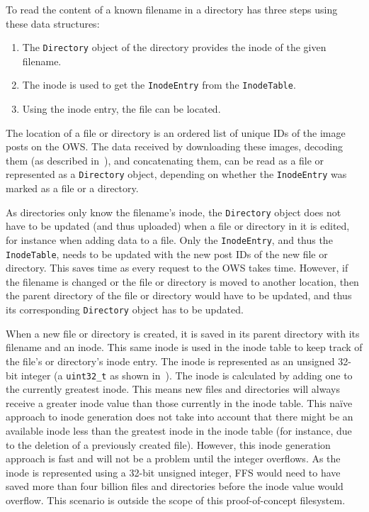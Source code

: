 
\clearpage

To read the content of a known filename in a directory has three steps using these data structures:
\begin{enumerate}
    \item The \texttt{Directory} object of the directory provides the inode of the given filename.
    
    \item The inode is used to get the \texttt{InodeEntry} from the \texttt{InodeTable}.
    
    \item Using the inode entry, the file can be located.
\end{enumerate}

The location of a file or directory is an ordered list of unique IDs of the image posts on the \gls{OWS}. The data received by downloading these images, decoding them (as described in~), and concatenating them, can be read as a file or represented as a \texttt{Directory} object, depending on whether the \texttt{InodeEntry} was marked as a file or a directory. 

As directories only know the filename's inode, the \texttt{Directory} object does not have to be updated (and thus uploaded) when a file or directory in it is edited, for instance when adding data to a file. Only the \texttt{InodeEntry}, and thus the \texttt{InodeTable}, needs to be updated with the new post IDs of the new file or directory. This saves time as every request to the \gls{OWS} takes time. However, if the filename is changed or the file or directory is moved to another location, then the parent directory of the file or directory would have to be updated, and thus its corresponding \texttt{Directory} object has to be updated.

When a new file or directory is created, it is saved in its parent directory with its filename and an inode. This same inode is used in the inode table to keep track of the file's or directory's inode entry. The inode is represented as an unsigned \mbox{32-bit} integer (\ie a \texttt{uint32\_t} as shown in~). The inode is calculated by adding one to the currently greatest inode. This means new files and directories will always receive a greater inode value than those currently in the inode table. This naïve approach to inode generation does not take into account that there might be an available inode less than the greatest inode in the inode table (for instance, due to the deletion of a previously created file). However, this inode generation approach is fast and will not be a problem until the integer overflows. As the inode is represented using a \mbox{32-bit} unsigned integer, \gls{FFS} would need to have saved more than four billion files and directories before the inode value would overflow. This scenario is outside the scope of this \mbox{proof-of-concept} filesystem.

